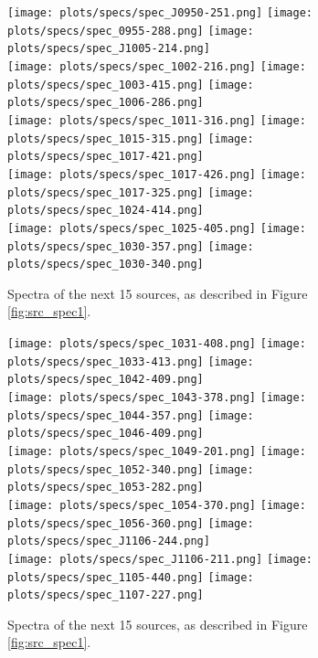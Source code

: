 \documentclass[preprint]{aastex}
\begin{document}
\begin{figure}\centering
\texttt{[image: plots/specs/spec\_J0950-251.png]}
\texttt{[image: plots/specs/spec\_0955-288.png]}
\texttt{[image: plots/specs/spec\_J1005-214.png]}\\
\texttt{[image: plots/specs/spec\_1002-216.png]}
\texttt{[image: plots/specs/spec\_1003-415.png]}
\texttt{[image: plots/specs/spec\_1006-286.png]}\\
\texttt{[image: plots/specs/spec\_1011-316.png]}
\texttt{[image: plots/specs/spec\_1015-315.png]}
\texttt{[image: plots/specs/spec\_1017-421.png]}\\
\texttt{[image: plots/specs/spec\_1017-426.png]}
\texttt{[image: plots/specs/spec\_1017-325.png]}
\texttt{[image: plots/specs/spec\_1024-414.png]}\\
\texttt{[image: plots/specs/spec\_1025-405.png]}
\texttt{[image: plots/specs/spec\_1030-357.png]}
\texttt{[image: plots/specs/spec\_1030-340.png]}\\
\caption{Spectra of the next 15 sources, as described in Figure \ref{fig:src_spec1}.
}\label{fig:src_spec14}
\end{figure}\clearpage

\begin{figure}\centering
\texttt{[image: plots/specs/spec\_1031-408.png]}
\texttt{[image: plots/specs/spec\_1033-413.png]}
\texttt{[image: plots/specs/spec\_1042-409.png]}\\
\texttt{[image: plots/specs/spec\_1043-378.png]}
\texttt{[image: plots/specs/spec\_1044-357.png]}
\texttt{[image: plots/specs/spec\_1046-409.png]}\\
\texttt{[image: plots/specs/spec\_1049-201.png]}
\texttt{[image: plots/specs/spec\_1052-340.png]}
\texttt{[image: plots/specs/spec\_1053-282.png]}\\
\texttt{[image: plots/specs/spec\_1054-370.png]}
\texttt{[image: plots/specs/spec\_1056-360.png]}
\texttt{[image: plots/specs/spec\_J1106-244.png]}\\
\texttt{[image: plots/specs/spec\_J1106-211.png]}
\texttt{[image: plots/specs/spec\_1105-440.png]}
\texttt{[image: plots/specs/spec\_1107-227.png]}\\
\caption{Spectra of the next 15 sources, as described in Figure \ref{fig:src_spec1}.
}\label{fig:src_spec15}
\end{figure}\clearpage
\end{document}
